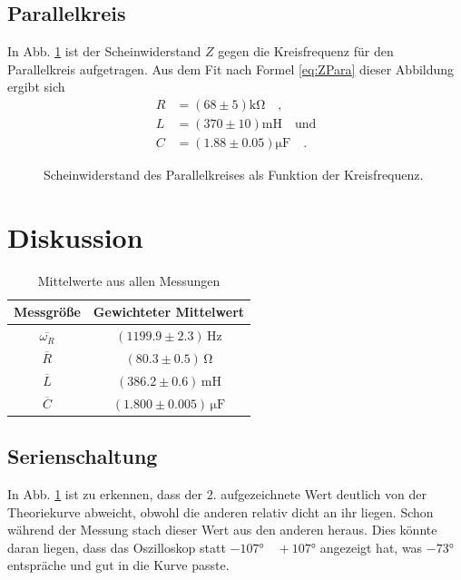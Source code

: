 \documentclass[12pt,a4paper,titlepage,headinclude,bibtotoc]{scrartcl}
\begin{document}
\subsection{Parallelkreis}
In Abb. \ref{fig:messung3} ist der Scheinwiderstand $Z$ gegen die Kreisfrequenz für den Parallelkreis aufgetragen.
Aus dem Fit nach Formel \eqref{eq:ZPara} dieser Abbildung ergibt sich
\begin{align*}
R &= (68\pm 5)\si{\kilo\ohm}\quad ,\\
L &= (370 \pm 10)\si{\milli\henry}\quad \text{und}\\
C &= (1.88  \pm 0.05) \si{\micro\farad}\quad .
\end{align*}
\begin{figure}[!htb]
	\centering
	
	\caption{Scheinwiderstand des Parallelkreises als Funktion der Kreisfrequenz.}
	\label{fig:messung3}
\end{figure}

\section{Diskussion}
\label{sec:diskussion}
\renewcommand{\arraystretch}{1.4} 
\begin{table}
\centering
\begin{tabular}{|c|c|}
\hline
Messgröße		&	Gewichteter Mittelwert\\\hline\hline
$\overline{\omega_R}$	&	$(1199.9\pm 2.3)\,\si{\hertz}$\\\hline
$\overline R$		&	$(80.3 \pm 0.5)\,\si{\ohm}$\\\hline
$\overline L$		&	$(386.2 \pm 0.6)\,\si{\milli\henry}$\\\hline
$\overline C$		&	$(1.800 \pm 0.005)\,\si{\micro\farad}$\\\hline
\end{tabular}
\caption{Mittelwerte aus allen Messungen}
\label{tab:mittelwerteserie}
\end{table}

\subsection{Serienschaltung}
In Abb. \ref{fig:messung3} ist zu erkennen, dass der 2. aufgezeichnete Wert deutlich von der Theoriekurve abweicht, obwohl die anderen relativ dicht an ihr liegen.
Schon während der Messung stach dieser Wert aus den anderen heraus.
Dies könnte daran liegen, dass das Oszilloskop statt $-107\si\degree\quad +107\si\degree$ angezeigt hat, was $-73\si\degree$ entspräche und gut in die Kurve passte.\\
\end{document}
